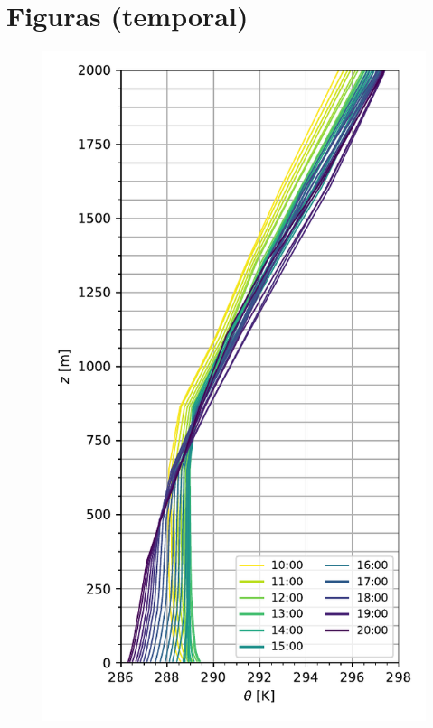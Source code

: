 \section*{Figuras (temporal)}

\begin{figure}[H]
	\begin{minipage}{0.5\linewidth}
	\end{minipage}%
	\begin{minipage}{0.5\linewidth}
	\end{minipage}%
	
	\begin{minipage}{0.5\linewidth}
		\centering
		\includegraphics[width=0.86\linewidth,trim={0cm 5mm 0cm 0mm},clip]{Imagenes/06/hov/pbl}%

\end{minipage}
\end{figure}
